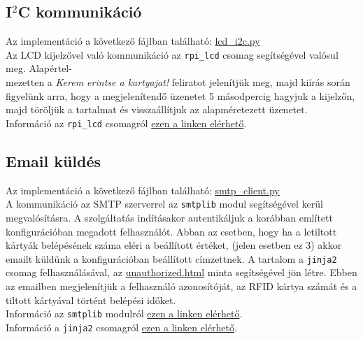 \documentclass[11pt, a4paper]{article}
\begin{document}
		\subsection{I$^2$C kommunikáció}
			\begin{flushleft}
				\justifying
				Az implementáció a következő fájlban található:
				\color{blue} \href{https://github.com/mark182182/GKLB_INTM020_mikroelektromechanikai_rendszerek/blob/main/raspi/lcd_i2c.py}{lcd\_i2c.py}
				\color{black} \\
				Az LCD kijelzővel való kommunikáció az \texttt{rpi\_lcd} csomag segítségével valósul meg. Alapértel-\\mezetten a \emph{Kerem erintse a kartyajat!} feliratot jelenítjük meg, majd kiírás során figyelünk arra, hogy a megjelenítendő üzenetet 5 másodpercig hagyjuk a kijelzőn, majd töröljük a tartalmat és visszaállítjuk az alapméretezett üzenetet. \\
				Információ az \texttt{rpi\_lcd} csomagról
				\color{blue}
				\href{https://github.com/bogdal/rpi-lcd}{ezen a linken elérhető}\color{black}.
				
			\end{flushleft}
		
		\subsection{Email küldés}
		\begin{flushleft}
			\justifying
			Az implementáció a következő fájlban található:
			\color{blue} \href{https://github.com/mark182182/GKLB_INTM020_mikroelektromechanikai_rendszerek/blob/main/smtp/smtp_client.py}{smtp\_client.py}
			\color{black} \\
			A kommunikáció az SMTP szerverrel az \texttt{smtplib} modul segítségével kerül megvalósításra. A szolgáltatás indításakor autentikáljuk a korábban említett konfigurációban megadott felhasználót. Abban az esetben, hogy ha a letiltott kártyák belépésének száma eléri a beállított értéket, (jelen esetben ez 3) akkor emailt küldünk a konfigurációban beállított címzettnek. A tartalom a \texttt{jinja2} csomag felhasználásával, az
			\color{blue}
			\href{https://github.com/mark182182/GKLB_INTM020_mikroelektromechanikai_rendszerek/blob/main/templates/unauthorized.html}{unauthorized.html}
			\color{black} minta segítségével jön létre. Ebben az emailben megjelenítjük a felhasználó azonosítóját, az RFID kártya számát és a tiltott kártyával történt belépési időket. \\
			Információ az \texttt{smtplib} modulról
			\color{blue}
			\href{https://docs.python.org/3/library/smtplib.html}{ezen a linken elérhető}\color{black}. \\
			Információ a \texttt{jinja2} csomagról
			\color{blue}
			\href{https://jinja.palletsprojects.com/en/3.1.x/}{ezen a linken elérhető}\color{black}.
		\end{flushleft}	
			
\end{document}
